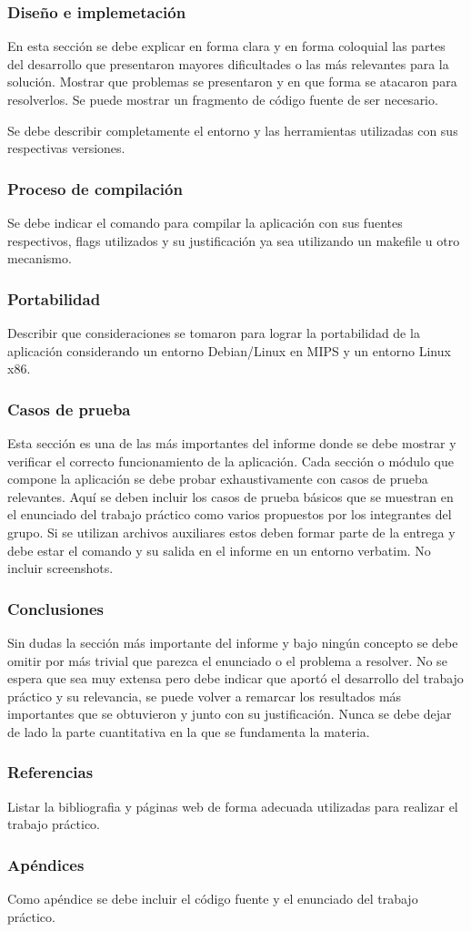 \documentclass{beamer}
\begin{document}
\begin{frame}
\frametitle{Diseño e implemetación}
En esta sección se debe explicar en forma clara y en forma coloquial las partes del desarrollo que presentaron mayores dificultades o las más relevantes para la solución. Mostrar que problemas se presentaron y en que forma se atacaron para resolverlos. Se puede mostrar un fragmento de código fuente de ser necesario.

Se debe describir completamente el entorno y las herramientas utilizadas con sus respectivas versiones.
\end{frame}

\begin{frame}
\frametitle{Proceso de compilación}
Se debe indicar el comando para compilar la aplicación con sus fuentes respectivos, flags utilizados y su justificación ya sea utilizando un makefile u otro mecanismo.
\end{frame}

\begin{frame}
\frametitle{Portabilidad}
Describir que consideraciones se tomaron para lograr la portabilidad de la aplicación considerando un entorno Debian/Linux en MIPS y un entorno Linux x86.
\end{frame}

\begin{frame}
\frametitle{Casos de prueba}
Esta sección es una de las más importantes del informe donde se debe mostrar y verificar el correcto funcionamiento de la aplicación. Cada sección o módulo que compone la aplicación se debe probar exhaustivamente con casos de prueba relevantes. Aquí se deben incluir los casos de prueba básicos que se muestran en el enunciado del trabajo práctico como varios propuestos por los integrantes del grupo. Si se utilizan archivos auxiliares estos deben formar parte de la entrega y debe estar el comando y su salida en el informe en un entorno verbatim. No incluir screenshots.
\end{frame}


\begin{frame}
\frametitle{Conclusiones}
Sin dudas la sección más importante del informe y bajo ningún concepto se debe omitir por más trivial que parezca el enunciado o el problema a resolver. No se espera que sea muy extensa pero debe indicar que aportó el desarrollo del trabajo práctico y su relevancia, se puede volver a remarcar los resultados más importantes que se obtuvieron y junto con su justificación. Nunca se debe dejar de lado la parte cuantitativa en la que se fundamenta la materia. 
\end{frame}

\begin{frame}
\frametitle{Referencias}
Listar la bibliografia y páginas web de forma adecuada utilizadas para realizar el trabajo práctico. 
\end{frame}

\begin{frame}
\frametitle{Apéndices}
Como apéndice se debe incluir el código fuente y el enunciado del trabajo práctico.
\end{frame}
\end{document}
